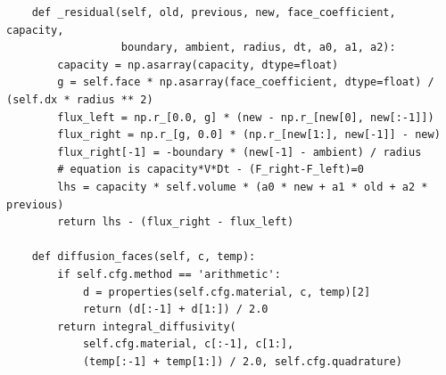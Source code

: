 \begin{verbatim}
    def _residual(self, old, previous, new, face_coefficient, capacity,
                  boundary, ambient, radius, dt, a0, a1, a2):
        capacity = np.asarray(capacity, dtype=float)
        g = self.face * np.asarray(face_coefficient, dtype=float) / (self.dx * radius ** 2)
        flux_left = np.r_[0.0, g] * (new - np.r_[new[0], new[:-1]])
        flux_right = np.r_[g, 0.0] * (np.r_[new[1:], new[-1]] - new)
        flux_right[-1] = -boundary * (new[-1] - ambient) / radius
        # equation is capacity*V*Dt - (F_right-F_left)=0
        lhs = capacity * self.volume * (a0 * new + a1 * old + a2 * previous)
        return lhs - (flux_right - flux_left)

    def diffusion_faces(self, c, temp):
        if self.cfg.method == 'arithmetic':
            d = properties(self.cfg.material, c, temp)[2]
            return (d[:-1] + d[1:]) / 2.0
        return integral_diffusivity(
            self.cfg.material, c[:-1], c[1:],
            (temp[:-1] + temp[1:]) / 2.0, self.cfg.quadrature)


\end{verbatim}
